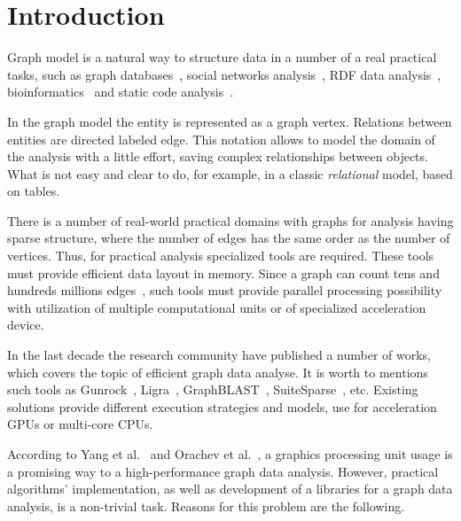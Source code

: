 \section*{Introduction}

Graph model is a natural way to structure data in a number of a real practical tasks, such as graph databases~\cite{article:querying_graph_databases, paper:redisgraph}, social networks analysis~\cite{article:facebook_large_scale}, RDF data analysis~\cite{article:cfpq_and_rdf_analysis}, bioinformatics~\cite{article:rna_prediction} and static code analysis~\cite{article:dyck_cfl_code_analysis}. 

In the graph model the entity is represented as a graph vertex. Relations between entities are directed labeled edge. This notation allows to model the domain of the analysis with a little effort, saving complex relationships between objects. What is not easy and clear to do, for example, in a classic \textit{relational} model, based on tables.

There is a number of real-world practical domains with graphs for analysis having sparse structure, where the number of edges has the same order as the number of vertices. Thus, for practical analysis specialized tools are required. These tools must provide efficient data layout in memory. Since a graph can count tens and hundreds millions edges~\cite{article:facebook_large_scale}, such tools must provide parallel processing possibility with utilization of multiple computational units or of specialized acceleration device.

In the last decade the research community have published a number of works, which covers the topic of efficient graph data analyse. It is worth to mentions such tools as Gunrock~\cite{article:gunrock}, Ligra~\cite{article:ligra}, GraphBLAST~\cite{yang2019graphblast}, SuiteSparse~\cite{article:suite_sparse_for_graph_problems}, etc. Existing solutions provide different execution strategies and models, use for acceleration GPUs or multi-core CPUs.

According to Yang et al.~\cite{yang2019graphblast} and Orachev et al.~\cite{net:cubool_project}, a graphics processing unit usage is a promising way to a high-performance graph data analysis. However, practical algorithms' implementation, as well as development of a libraries for a graph data analysis, is a non-trivial task. Reasons for this problem are the following.

